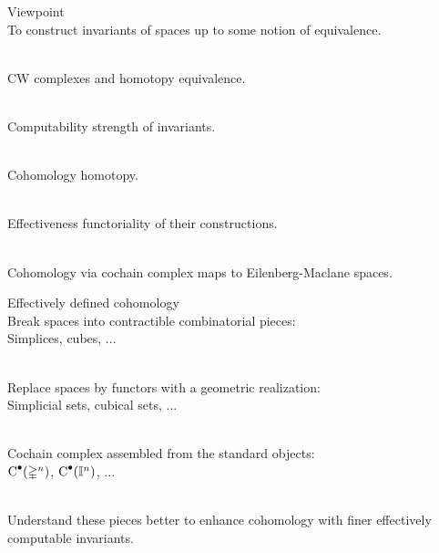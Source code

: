 
\begin{frame}{Viewpoint}
	\pause
	 \\
	To construct invariants of spaces up to some notion of equivalence.

	\bigskip\pause
	 \\
	CW complexes and homotopy equivalence.

	\bigskip\pause
	 \\
	Computability  strength of invariants.

	\bigskip\pause
	 \\
	Cohomology  homotopy.

	\bigskip\pause
	 \\
	Effectiveness  functoriality of their constructions.

	\bigskip\pause
	 \\
	Cohomology via cochain complex  maps to Eilenberg-Maclane spaces.
\end{frame}

\begin{frame}{Effectively defined cohomology}
	\pause
	 \\
	Break spaces into contractible combinatorial pieces: \\
	Simplices, cubes, ...

	\bigskip\pause
	 \\
	Replace spaces by functors with a geometric realization: \\
	Simplicial sets, cubical sets, ...

	\bigskip\pause
	 \\
	Cochain complex assembled from the standard objects: \\
	$\operatorname{C}^\bullet(\mathbb{\Delta}^n)$, $\operatorname{C}^\bullet(\mathbb{I}^n)$, ...

	\bigskip\pause
	 \\
	Understand these pieces better to enhance cohomology with finer effectively computable invariants.
\end{frame}
